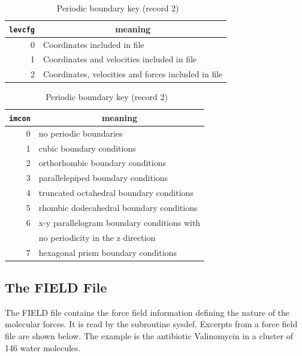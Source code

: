 \begin{table}[t]
 \caption{\label{LEVCFG}\ CONFIG file key (record 2)}
\vskip 10pt
 \begin{centering} \begin{tabular}{|r|l|}
\hline
{\tt levcfg} & \multicolumn{1}{c|}{meaning} \\
\hline
0 & Coordinates included in file\\
1 & Coordinates and velocities included in file\\
2 & Coordinates, velocities and forces included in file\\
\hline
\end{tabular}

\end{centering}

 \caption{\label{IMCON}\ Periodic boundary key (record 2)}
\vskip 10pt
\begin{centering} \begin{tabular}{|r|l|}
\hline
{\tt imcon} & \multicolumn{1}{c|}{meaning} \\
\hline
0 & no periodic boundaries\\
1 & cubic boundary conditions\index{boundary conditions!cubic}\\
2 & orthorhombic boundary conditions\\
3 & parallelepiped boundary conditions\\
4 & truncated octahedral\index{boundary conditions!truncated octahedron} boundary conditions\\
5 & rhombic dodecahedral\index{boundary conditions!rhombic dodecahedron} boundary conditions\\
6 & x-y parallelogram boundary conditions with\\
  & no periodicity in the z direction\\
7 & hexagonal prism\index{boundary conditions!hexagonal prism} boundary conditions \\
\hline
\end{tabular}

\end{centering}

\end{table}
\clearpage
\subsection{The FIELD File}
\label{fieldfile}

The FIELD file contains the force field information defining the
nature of the molecular forces. It is read by the subroutine {\sc
sysdef}. Excerpts from a force field file are shown below. The example
is the antibiotic Valinomycin in a cluster of 146 water molecules.


